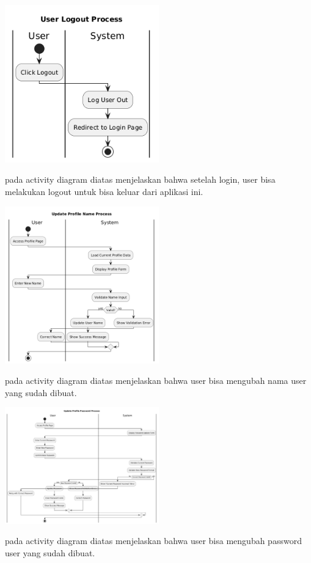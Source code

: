 \begin{center}
    \includegraphics[width=0.5\textwidth]{assets/activity_diagrams/user_logout.png}
\end{center}
pada activity diagram diatas menjelaskan bahwa setelah login, user bisa melakukan logout untuk bisa keluar dari aplikasi ini.

\begin{center}
    \includegraphics[width=0.5\textwidth]{assets/activity_diagrams/user_profile_update_name.png}
\end{center}
pada activity diagram diatas menjelaskan bahwa user bisa mengubah nama user yang sudah dibuat.

\begin{center}
    \includegraphics[width=0.5\textwidth]{assets/activity_diagrams/user_profile_update_password.png}
\end{center}
pada activity diagram diatas menjelaskan bahwa user bisa mengubah password user yang sudah dibuat.

